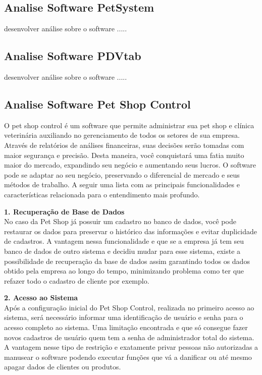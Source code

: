 \documentclass[12pt,openright,twoside,a4paper,english,french,spanish,brazil]{abntex2}
\begin{document}
\subsection*{Analise Software PetSystem}
desenvolver análise sobre o software .....

\subsection*{Analise Software PDVtab}
desenvolver análise sobre o software .....

\subsection*{Analise Software Pet Shop Control}
O pet shop control é um software que permite administrar sua pet shop e clínica veterinária auxiliando no gerenciamento de todos os setores de sua empresa. Através de relatórios de análises financeiras, suas decisões serão tomadas com maior segurança e precisão. Desta maneira, você conquistará uma fatia muito maior do mercado, expandindo seu negócio e aumentando seus lucros. O software pode se adaptar ao seu negócio, preservando o diferencial de mercado e seus métodos de trabalho.
A seguir uma lista com as principais funcionalidades e características relacionada para o entendimento mais profundo.

\textbf{1.	{Recuperação de Base de Dados}}\\
No caso da Pet Shop já possuir um cadastro no banco de dados, você pode restaurar os dados para preservar o histórico das informações e evitar duplicidade de cadastros.
A vantagem nessa funcionalidade e que se a empresa já tem seu banco de dados de outro sistema e decidiu mudar para esse sistema, existe a possibilidade de recuperação da base de dados assim garantindo todos os dados obtido pela empresa ao longo do tempo, minimizando problema como ter que refazer todo o cadastro de cliente por exemplo.

\textbf{2.	{Acesso ao Sistema}}\\
Após a configuração inicial do Pet Shop Control, realizada no primeiro acesso ao sistema, será necessário informar uma identificação de usuário e senha para o acesso completo ao sistema. Uma limitação encontrada e que só consegue fazer novos cadastros de usuário quem tem a senha de administrador total do sistema. A vantagem nesse tipo de restrição e exatamente privar pessoas não autorizadas a manusear o software podendo executar funções que vá a danificar ou até mesmo apagar dados de clientes ou produtos.
\end{document}

